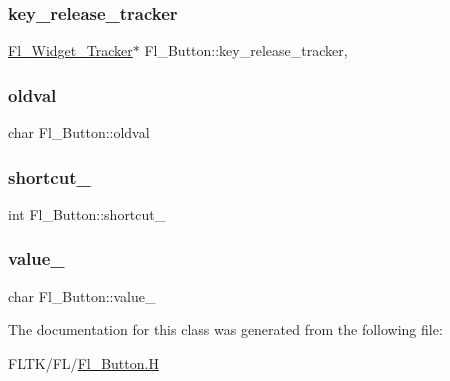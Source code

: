 \subsubsection{\texorpdfstring{key\+\_\+release\+\_\+tracker}{key\_release\_tracker}}
{\footnotesize\ttfamily \hyperlink{class_fl___widget___tracker}{Fl\+\_\+\+Widget\+\_\+\+Tracker}$\ast$ Fl\+\_\+\+Button\+::key\+\_\+release\+\_\+tracker\hspace{0.3cm}{\ttfamily [static]}, {\ttfamily [protected]}}

\mbox{\label{class_fl___button_a5dce2dba13e7333a048b7c15944580fa}} 
\subsubsection{\texorpdfstring{oldval}{oldval}}
{\footnotesize\ttfamily char Fl\+\_\+\+Button\+::oldval\hspace{0.3cm}{\ttfamily [private]}}

\mbox{\label{class_fl___button_a037348dac96f02a7b3c0789f48c24e89}} 
\subsubsection{\texorpdfstring{shortcut\+\_\+}{shortcut\_}}
{\footnotesize\ttfamily int Fl\+\_\+\+Button\+::shortcut\+\_\+\hspace{0.3cm}{\ttfamily [private]}}

\mbox{\label{class_fl___button_a040cbe57382fdffce471b97a1a059929}} 
\subsubsection{\texorpdfstring{value\+\_\+}{value\_}}
{\footnotesize\ttfamily char Fl\+\_\+\+Button\+::value\+\_\+\hspace{0.3cm}{\ttfamily [private]}}



The documentation for this class was generated from the following file\+:\begin{DoxyCompactItemize}
\item 
F\+L\+T\+K/\+F\+L/\hyperlink{_fl___button_8_h}{Fl\+\_\+\+Button.\+H}\end{DoxyCompactItemize}
